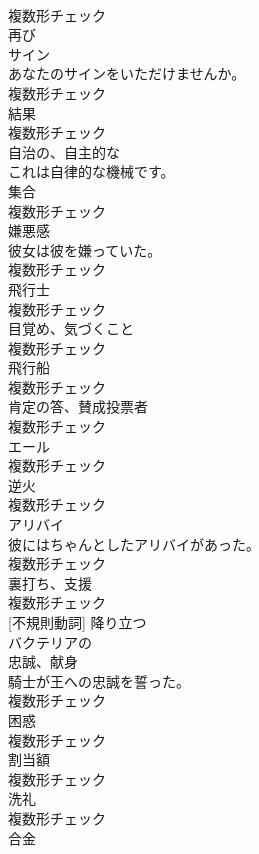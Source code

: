 \documentclass[8pt]{extreport}
\begin{document}
\begin{CJK}{UTF8}{min}
\\	複数形チェック
\\	[副詞]	再び	
\\	[名詞]	サイン	
\\	あなたのサインをいただけませんか。	
\\	複数形チェック
\\	[名詞]	結果	
\\	複数形チェック
\\	[形容詞]	自治の、自主的な	
\\	これは自律的な機械です。	
\\	[名詞]	集合	
\\	複数形チェック
\\	[名詞]	嫌悪感	
\\	彼女は彼を嫌っていた。	
\\	複数形チェック
\\	[名詞]	飛行士	
\\	複数形チェック
\\	[名詞]	目覚め、気づくこと	
\\	複数形チェック
\\	[名詞]	飛行船	
\\	複数形チェック
\\	[名詞]	肯定の答、賛成投票者	
\\	複数形チェック
\\	[名詞]	エール	
\\	複数形チェック
\\	[名詞]	逆火	
\\	複数形チェック
\\	[名詞]	アリバイ	
\\	彼にはちゃんとしたアリバイがあった。	
\\	複数形チェック
\\	[名詞]	裏打ち、支援	
\\	複数形チェック
\\	[動詞] [不規則動詞]	降り立つ	
\\	[形容詞]	バクテリアの	
\\	[名詞]	忠誠、献身	
\\	騎士が王への忠誠を誓った。	
\\	複数形チェック
\\	[名詞]	困惑	
\\	複数形チェック
\\	[名詞]	割当額	
\\	複数形チェック
\\	[名詞]	洗礼	
\\	複数形チェック
\\	[名詞]	合金	

\end{CJK}
\end{document}
